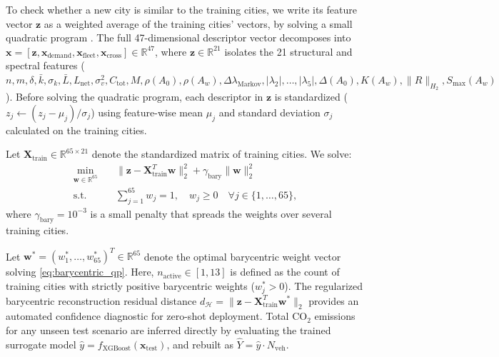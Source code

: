 \documentclass[journal]{IEEEtran}
\begin{document}
To check whether a new city is similar to the training cities, we write its feature vector $\mathbf{z}$ as a weighted average of the training cities' vectors, by solving a small quadratic program \cite{Boyd2004}. The full 47-dimensional descriptor vector decomposes into $\mathbf{x} = [\mathbf{z}, \mathbf{x}_{\text{demand}}, \mathbf{x}_{\text{fleet}}, \mathbf{x}_{\text{cross}}] \in \mathbb{R}^{47}$, where $\mathbf{z} \in \mathbb{R}^{21}$ isolates the 21 structural and spectral features ($n, m, \delta, \bar{k}, \sigma_k, \bar{L}, L_{\text{net}}, \sigma_v^2, C_{\text{tot}}, M, \rho(A_0), \rho(A_w), \Delta\lambda_{\text{Markov}}, |\lambda_2|, \dots, |\lambda_5|, \Delta(A_0), K(A_w), \|R\|_{H_2}, S_{\max}(A_w)$). Before solving the quadratic program, each descriptor in $\mathbf{z}$ is standardized ($z_j \leftarrow (z_j - \mu_j) / \sigma_j$) using feature-wise mean $\mu_j$ and standard deviation $\sigma_j$ calculated on the training cities.

Let $\mathbf{X}_{\text{train}} \in \mathbb{R}^{65 \times 21}$ denote the standardized matrix of training cities. We solve:
\begin{equation}
\begin{aligned}
\min_{\mathbf{w} \in \mathbb{R}^{65}} \quad & \| \mathbf{z} - \mathbf{X}_{\text{train}}^T \mathbf{w} \|_2^2 + \gamma_{\text{bary}} \| \mathbf{w} \|_2^2 \\
\text{s.t.} \quad & \sum_{j=1}^{65} w_j = 1, \quad w_j \ge 0 \quad \forall j \in \{1, \dots, 65\},
\end{aligned}
\label{eq:barycentric_qp}
\end{equation}
where $\gamma_{\text{bary}} = 10^{-3}$ is a small penalty that spreads the weights over several training cities.

Let $\mathbf{w}^* = (w_1^*, \dots, w_{65}^*)^T \in \mathbb{R}^{65}$ denote the optimal barycentric weight vector solving \eqref{eq:barycentric_qp}. Here, $n_{\text{active}} \in [1, 13]$ is defined as the count of training cities with strictly positive barycentric weights ($w_j^* > 0$). The regularized barycentric reconstruction residual distance $d_{\mathcal{H}} = \| \mathbf{z} - \mathbf{X}_{\text{train}}^T \mathbf{w}^* \|_2$ provides an automated confidence diagnostic for zero-shot deployment. Total $\text{CO}_2$ emissions for any unseen test scenario are inferred directly by evaluating the trained surrogate model $\hat{y} = f_{\text{XGBoost}}(\mathbf{x}_{\text{test}})$, and rebuilt as $\hat{Y} = \hat{y} \cdot N_{\text{veh}}$.
\end{document}
